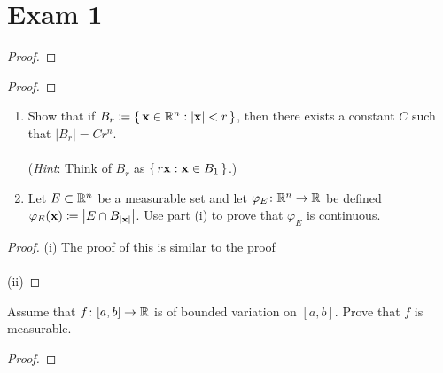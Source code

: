 \section{Exam 1}

\begin{problem}
\end{problem}
\begin{proof}
\end{proof}

\begin{problem}
\end{problem}
\begin{proof}
\end{proof}

\begin{problem}
\hfill
\begin{enumerate}[label=(\roman*)]
\item Show that if $B_r\coloneqq\left\{\,\mathbf{x}\in\mathbb{R}^n:|\mathbf{x}|<r\,\right\}$,
  then there exists a constant $C$ such that $|B_r|=Cr^n$.
\\\\
(\emph{Hint}: Think of $B_r$ as $\left\{\,r\mathbf{x}:\mathbf{x}\in B_1\,\right\}$.)
\item Let $E\subset\mathbb{R}^n$ be a measurable set and let
  $\varphi_E\colon\mathbb{R}^n\to\mathbb{R}$ be defined
  $\varphi_E(\mathbf{x})\coloneqq\left|E\cap B_{|\mathbf{x}|}\right|$. Use part (i) to prove
    that $\varphi_E$ is continuous.
\end{enumerate}
\end{problem}
\begin{proof}
(i) The proof of this is similar to the proof
\\\\
(ii)
\end{proof}

\begin{problem}
Assume that $f\colon[a,b]\to\mathbb{R}$ is of bounded variation on $[a,b]$. Prove
that $f$ is measurable.
\end{problem}
\begin{proof}

\end{proof}

